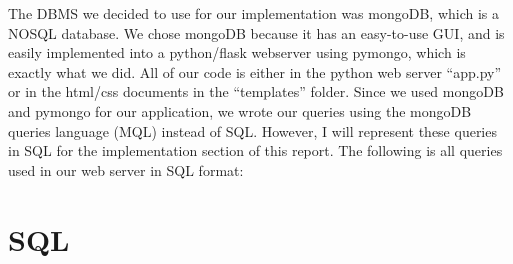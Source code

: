 \documentclass[12pt]{article} %
\begin{document}
The DBMS we decided to use for our implementation was mongoDB, which is a NOSQL database. We chose mongoDB because it has an easy-to-use GUI, and is easily implemented into a python/flask webserver using pymongo, which is exactly what we did. All of our code is either in the python web server “app.py” or in the html/css documents in the “templates” folder. Since we used mongoDB and pymongo for our application, we wrote our queries using the mongoDB queries language (MQL) instead of SQL. However, I will represent these queries in SQL for the implementation section of this report. The following is all queries used in our web server in SQL format: 

\section{SQL}
\end{document}
